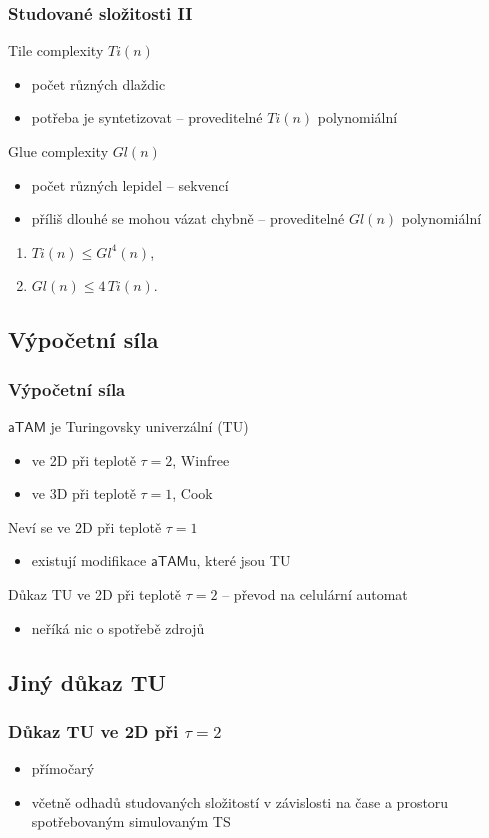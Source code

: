 \documentclass[10pt]{beamer}
\newcommand{\atam}{\mathsf{aTAM}}
\theoremstyle{definition}
\theoremstyle{remark}
\begin{document}
\begin{frame}
\frametitle{Studované složitosti II}
	Tile complexity $Ti(n)$
	\begin{itemize}
		\item počet různých dlaždic
		\item potřeba je syntetizovat -- proveditelné $Ti(n)$ polynomiální
	\end{itemize}
	Glue complexity $Gl(n)$
	\begin{itemize}
		\item počet různých lepidel -- sekvencí
		\item příliš dlouhé se mohou vázat chybně -- proveditelné $Gl(n)$ polynomiální
	\end{itemize}
	\begin{lemma}
		\begin{enumerate}
			\item $Ti(n) \leq Gl^4(n)$,
			\item $Gl(n) \leq 4\,Ti(n)$.
		\end{enumerate}
	\end{lemma}
\end{frame}

\subsection{Výpočetní síla}
\begin{frame}
\frametitle{Výpočetní síla}
	$\atam$ je Turingovsky univerzální (TU)
	\begin{itemize}
		\item ve 2D při teplotě $\tau=2$, Winfree \cite{winfree_phd}
		\item ve 3D při teplotě $\tau=1$, Cook \cite{cook_temp1}
	\end{itemize}
	Neví se ve 2D při teplotě $\tau=1$
	\begin{itemize}
		\item existují modifikace $\atam$u, které jsou TU
	\end{itemize}
	Důkaz TU ve 2D při teplotě $\tau=2$ -- převod na celulární automat
	\begin{itemize}
		\item neříká nic o spotřebě zdrojů
	\end{itemize}
\end{frame}

\subsection{Jiný důkaz TU}
\begin{frame}
\frametitle{Důkaz TU ve 2D při $\tau=2$}
	\begin{itemize}
		\item přímočarý
		\item včetně odhadů studovaných složitostí v závislosti na čase a prostoru spotřebovaným simulovaným TS
	\end{itemize}
\end{frame}
\end{document}
